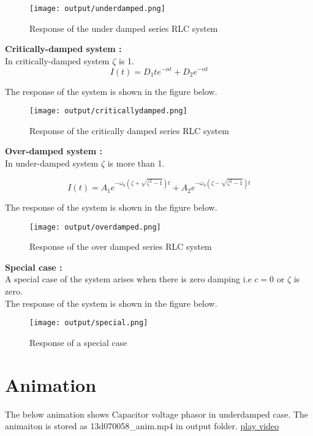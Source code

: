 \documentclass[11pt]{article}
\begin{document}
\begin{figure}[H]
	\centering
	\centering
	\texttt{[image: output/underdamped.png]}
	\caption{Response of the under damped series RLC system}
\end{figure}
\label{fig1}

\newpage
\noindent\textbf{Critically-damped system :} \\
In critically-damped system $\zeta$ is 1.
\begin{equation}
I(t) = D_1 t e^{-\alpha t} + D_2 e^{-\alpha t}
\label{critically-damped-eqn}
\end{equation}


The response of the system is shown in the figure below.

\begin{figure}[H]
	\centering
	\centering
	\texttt{[image: output/criticallydamped.png]}
	\caption{Response of the critically damped series RLC system}
\end{figure}
\label{fig2}

\newpage
\noindent\textbf{Over-damped system :} \\
In under-damped system $\zeta$ is more than 1.

\begin{equation}
I(t) = A_1 e^{-\omega_0 \left ( \zeta + \sqrt {\zeta^2 - 1} \right ) t} + A_2 e^{-\omega_0 \left ( \zeta - \sqrt {\zeta^2 - 1} \right ) t}
\label{critically-damped-eqn}
\end{equation}


The response of the system is shown in the figure below.

\begin{figure}[H]
	\centering
	\centering
	\texttt{[image: output/overdamped.png]}
	\caption{Response of the over damped series RLC system}
\end{figure}
\label{fig3}

\newpage
\noindent\textbf{Special case :} \\
A special case of the system arises when there is zero damping i.e $c = 0$ or $\zeta$ is zero. \\

The response of the system is shown in the figure below.

\begin{figure}[H]
	\centering
	\centering
	\texttt{[image: output/special.png]}
	\caption{Response of a special case}
\end{figure}
\label{fig4}

\section{Animation}

The below animation shows Capacitor voltage phasor in underdamped case. The animaiton is stored as 13d070058\_anim.mp4 in output folder.
\href{run:13d070058_anim.mp4}{play video}

\nocite{*}
{}

 
\end{document}
